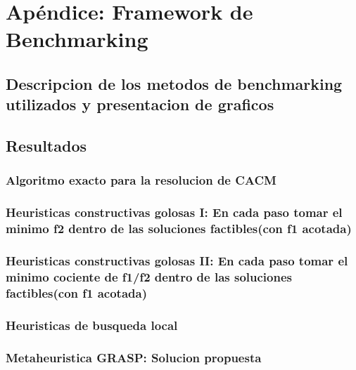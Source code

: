 \section{Ap\'endice: Framework de Benchmarking} \label{casos_de_prueba}
\subsection{Descripcion de los metodos de benchmarking utilizados y presentacion de graficos}
\subsection{Resultados}
\subsubsection{Algoritmo exacto para la resolucion de CACM}
\subsubsection{Heuristicas constructivas golosas I: En cada paso tomar el minimo f2 dentro de las soluciones factibles(con f1 acotada)}
\subsubsection{Heuristicas constructivas golosas II: En cada paso tomar el minimo cociente de f1/f2 dentro de las soluciones factibles(con f1 acotada)}
\subsubsection{Heuristicas de busqueda local}
\subsubsection{Metaheuristica GRASP: Solucion propuesta}
%



